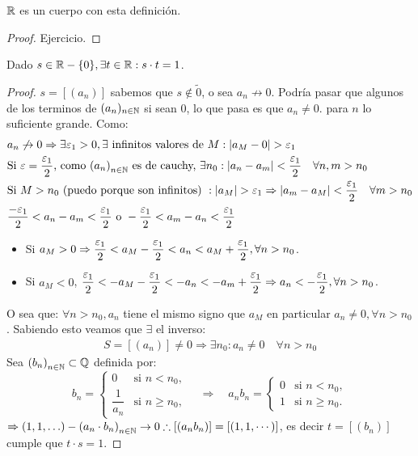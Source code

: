 \begin{prop}
	\(\mathbb{R} \) es un cuerpo con esta definición.
	\begin{proof}
		Ejercicio.
	\end{proof}
\end{prop}

\clearpage

\begin{theorem}
	Dado \(s \in \mathbb{R} - \{0\}, \exists t \in \mathbb{R} : s \cdot t = 1\).
	\begin{proof}
		\(s = [(a_n)]\) sabemos que \(s \notin \tilde{0} \), o sea \(a_n \not \to 0\).
		Podría pasar que algunos de los terminos de \((a_n)_{n \in \mathbb{N}} \) si sean \(0 \), lo que pasa es que \(a_n \neq 0.\) para \(n\) lo suficiente grande.
		Como:
		\begin{align*}
			 & a_n \not \to 0 \Rightarrow \exists \varepsilon_1 > 0, \exists \text{ infinitos valores de } M: |a_M - 0| > \varepsilon_1                                                       \\
			 & \text{Si } \varepsilon = \dfrac{\varepsilon_1}{2}\text{, como } {(a_n)}_{n \in \mathbb{N}} \text{ es de cauchy, } \exists n_0 : |a_n - a_m| < \dfrac{\varepsilon_1}{2} \quad \forall n, m > n_0 \\
			 & \text{Si } M > n_0 \text{ (puedo porque son infinitos) } : |a_M| > \varepsilon_1 \Rightarrow |a_m - a_M| < \dfrac{\varepsilon_1}{2} \quad \forall m > n_0                      \\
			 & \dfrac{-\varepsilon_1}{2} < a_n - a_m < \dfrac{\varepsilon_1}{2} \text{ o } -\dfrac{\varepsilon_1}{2} < a_m - a_n < \dfrac{\varepsilon_1}{2}
		\end{align*}\begin{itemize}
			\item Si \(a_M > 0 \Rightarrow \dfrac{\varepsilon_1}{2} < a_M - \dfrac{\varepsilon_1}{2} < a_n < a_M + \dfrac{\varepsilon_1}{2}, \forall n > n_0\).
			\item Si \(a_M < 0\), \(\dfrac{\varepsilon_1}{2} < -a_M - \dfrac{\varepsilon_1}{2} < -a_n<-a_m+ \dfrac{\varepsilon_1}{2} \Rightarrow a_n < -\dfrac{\varepsilon_1}{2}, \forall n > n_0\).
		\end{itemize}
		O sea que: \(\forall n > n_0, a_n\) tiene el mismo signo que \(a_M\) en particular \(a_n \neq 0, \forall n > n_0\). Sabiendo esto veamos que \(\exists \) el inverso: \begin{align*}
			S = [(a_n)] \neq 0 \Rightarrow \exists n_0 : a_n \neq 0 \quad \forall n > n_0
		\end{align*}
		Sea \({(b_n)}_{n \in \mathbb{N}} \subset \mathbb{Q} \) definida por:
		\[
			b_n =
			\begin{cases}
				0              & \text{si } n < n_0,    \\
				\dfrac{1}{a_n} & \text{si } n \geq n_0,
			\end{cases}
			\quad \Rightarrow \quad
			a_n b_n =
			\begin{cases}
				0 & \text{si } n < n_0,    \\
				1 & \text{si } n \geq n_0.
			\end{cases}
		\]
		\( \Rightarrow (1, 1, \ldots) - {(a_n \cdot b_n)}_{n \in \mathbb{N}} \to 0 \therefore [(a_n b_n)] = [(1, 1, \cdots)]\), es decir \(t = [(b_n)]\) cumple que \(t \cdot s = 1\).
	\end{proof}
\end{theorem}

